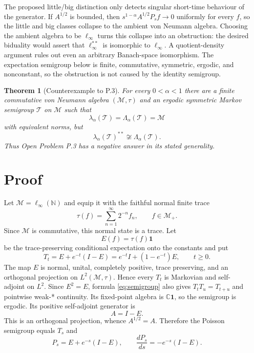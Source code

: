 \documentclass[11pt]{article}
\newtheorem{theorem}{Theorem}
\newcommand{\M}{\mathcal M}
\newcommand{\T}{\mathcal T}
\newcommand{\one}{\mathbf 1}
\newcommand{\N}{\mathbb N}
\begin{document}
The proposed little/big distinction only detects singular short-time
behaviour of the generator.  If $A^{1/2}$ is bounded, then
$s^{1-\alpha}A^{1/2}P_s f\to0$ uniformly for every $f$, so the little and big
classes collapse to the ambient von Neumann algebra.  Choosing the ambient
algebra to be $\ell_\infty$ turns this collapse into an obstruction: the
desired biduality would assert that $\ell_\infty^{**}$ is isomorphic to
$\ell_\infty$.  A quotient-density argument rules out even an arbitrary
Banach-space isomorphism.  The expectation semigroup below is finite,
commutative, symmetric, ergodic, and nonconstant, so the obstruction is not
caused by the identity semigroup.

\begin{theorem}[Counterexample to P.3]\label{thm:main}
For every $0<\alpha<1$ there are a finite commutative von Neumann algebra
$(\M,\tau)$ and an ergodic symmetric Markov semigroup $\T$ on $\M$ such that
\[
 \lambda_\alpha(\T)=\Lambda_\alpha(\T)=\M
\]
with equivalent norms, but
\[
 \lambda_\alpha(\T)^{**}\not\cong\Lambda_\alpha(\T).
\]
Thus Open Problem P.3 has a negative answer in its stated generality.
\end{theorem}

\section{Proof}

Let $\M=\ell_\infty(\N)$ and equip it with the faithful normal finite trace
\[
 \tau(f)=\sum_{n=1}^{\infty}2^{-n}f_n,
 \qquad f\in\M_+.
\]
Since $\M$ is commutative, this normal state is a trace.  Let
\[
 E(f)=\tau(f)\one
\]
be the trace-preserving conditional expectation onto the constants and put
\begin{equation}\label{eq:semigroup}
 T_t=E+e^{-t}(I-E)=e^{-t}I+(1-e^{-t})E,
 \qquad t\geq0.
\end{equation}
The map $E$ is normal, unital, completely positive, trace preserving, and an
orthogonal projection on $L^2(\M,\tau)$.  Hence every $T_t$ is Markovian and
self-adjoint on $L^2$.  Since $E^2=E$, formula \eqref{eq:semigroup} also gives
$T_tT_u=T_{t+u}$ and pointwise weak-* continuity.  Its fixed-point algebra is
$\mathbb C\one$, so the semigroup is ergodic.  Its positive self-adjoint
generator is
\[
 A=I-E.
\]
This is an orthogonal projection, whence $A^{1/2}=A$.  Therefore the Poisson
semigroup equals $T_s$ and
\begin{equation}\label{eq:derivative}
 P_s=E+e^{-s}(I-E),
 \qquad
 \frac{dP_s}{ds}=-e^{-s}(I-E).
\end{equation}
\end{document}
